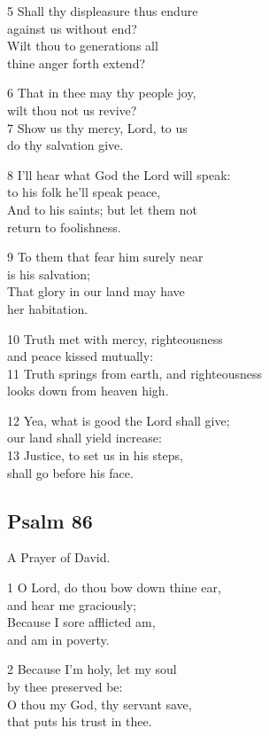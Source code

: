 5 Shall thy displeasure thus endure\\
against us without end?\\
Wilt thou to generations all\\
thine anger forth extend?

6 That in thee may thy people joy,\\
wilt thou not us revive?\\
7 Show us thy mercy, Lord, to us\\
do thy salvation give.

8 I’ll hear what God the Lord will speak:\\
to his folk he’ll speak peace,\\
And to his saints; but let them not\\
return to foolishness.

9 To them that fear him surely near\\
is his salvation;\\
That glory in our land may have\\
her habitation.

10 Truth met with mercy, righteousness\\
and peace kissed mutually:\\
11 Truth springs from earth, and righteousness\\
looks down from heaven high.

12 Yea, what is good the Lord shall give;\\
our land shall yield increase:\\
13 Justice, to set us in his steps,\\
shall go before his face.

\begin{center}
\quad{}\quad{}
\end{center}

\subsection*{Psalm 86}

A Prayer of David.

1 O Lord, do thou bow down thine ear,\\
and hear me graciously;\\
Because I sore afflicted am,\\
and am in poverty.

2 Because I’m holy, let my soul\\
by thee preserved be:\\
O thou my God, thy servant save,\\
that puts his trust in thee.

